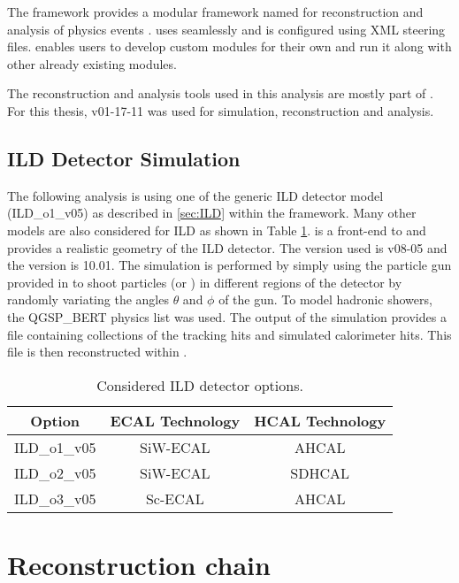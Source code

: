 The \ilcsoft framework provides a modular \cpp framework named \marlin for reconstruction and analysis of physics events \cite{Gaede:2006pj}. \marlin uses \lcio seamlessly and is configured using XML steering files. \marlin enables users to develop custom modules for their own and run it along with other already existing modules.

The reconstruction and analysis tools used in this analysis are mostly part of \ilcsoft. For this thesis, \ilcsoft v01-17-11 was used for simulation, reconstruction and analysis.

\subsection{ILD Detector Simulation}

The following analysis is using one of the generic ILD detector model (ILD\_o1\_v05) as described in \ref{sec:ILD} within the \mokka framework. Many other models are also considered for ILD as shown in Table \ref{table:ILDOptions}. \mokka is a front-end to \geant and provides a realistic geometry of the ILD detector. The \mokka version used is v08-05 and the \geant version is 10.01.
The simulation is performed by simply using the particle gun provided in \geant to shoot particles (\piminus or \kzeroL) in different regions of the detector by randomly variating the angles $\theta$ and $\phi$ of the gun. To model hadronic showers, the QGSP\_BERT physics list was used. The output of the simulation provides a \lcio file containing collections of the tracking hits and simulated calorimeter hits. This file is then reconstructed within \marlin.

\begin{table}[htb!]
  \centering
  \caption{Considered ILD detector options.} \label{table:ILDOptions}
  \begin{tabular}{|c|c|c|}
    \hline
    Option & ECAL Technology & HCAL Technology \\
    \hline
    ILD\_o1\_v05 & SiW-ECAL & AHCAL \\
    ILD\_o2\_v05 & SiW-ECAL & SDHCAL \\
    ILD\_o3\_v05 & Sc-ECAL & AHCAL \\
    \hline
  \end{tabular}
\end{table}

\section{Reconstruction chain}
\label{sec:recochain}

